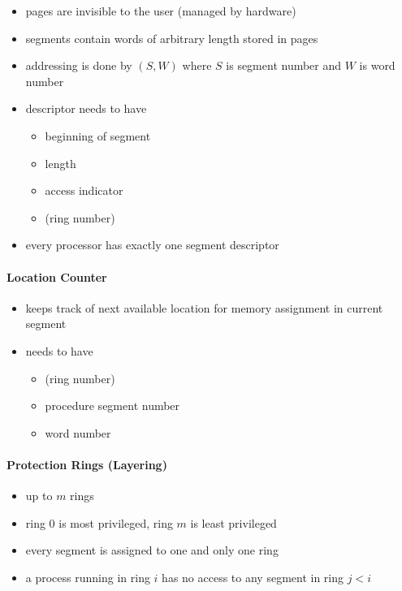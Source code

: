 \documentclass[
  12pt]{findlay}
\providecommand{\tightlist}{%
  \setlength{\itemsep}{0pt}\setlength{\parskip}{0pt}}
\begin{document}
\begin{itemize}
\tightlist
\item
  pages are invisible to the user (managed by hardware)
\item
  segments contain words of arbitrary length stored in pages
\item
  addressing is done by \((S,W)\) where \(S\) is segment number and
  \(W\) is word number
\item
  descriptor needs to have

  \begin{itemize}
  \tightlist
  \item
    beginning of segment
  \item
    length
  \item
    access indicator
  \item
    (ring number)
  \end{itemize}
\item
  every processor has exactly one segment descriptor
\end{itemize}

\hypertarget{location-counter}{%
\paragraph{Location Counter}\label{location-counter}}

\begin{itemize}
\tightlist
\item
  keeps track of next available location for memory assignment in
  current segment
\item
  needs to have

  \begin{itemize}
  \tightlist
  \item
    (ring number)
  \item
    procedure segment number
  \item
    word number
  \end{itemize}
\end{itemize}

\hypertarget{protection-rings-layering}{%
\paragraph{Protection Rings
(Layering)}\label{protection-rings-layering}}

\begin{itemize}
\tightlist
\item
  up to \(m\) rings
\item
  ring 0 is most privileged, ring \(m\) is least privileged
\item
  every segment is assigned to one and only one ring
\item
  a process running in ring \(i\) has no access to any segment in ring
  \(j < i\)
\end{itemize}

\printbibliography
\end{document}
